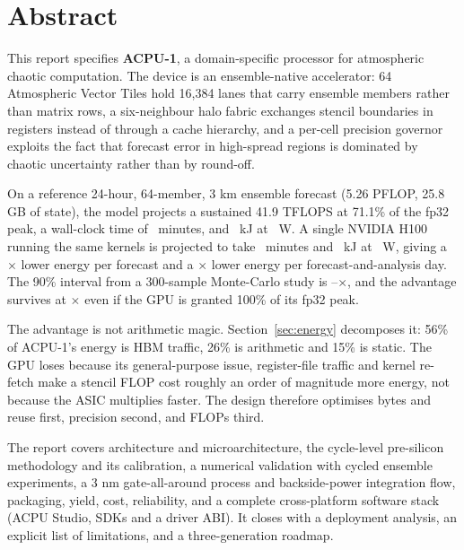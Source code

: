 \documentclass[10.5pt,a4paper]{article}
\newcommand{\ac}[1]{\textsf{\textbf{ACPU-#1}}}
\begin{document}
\setcounter{page}{2}

\section*{Abstract}
This report specifies \ac{1}, a domain-specific processor for atmospheric chaotic computation.
The device is an ensemble-native accelerator: 64 Atmospheric Vector Tiles hold 16,384 lanes that
carry ensemble members rather than matrix rows, a six-neighbour halo fabric exchanges stencil
boundaries in registers instead of through a cache hierarchy, and a per-cell precision governor
exploits the fact that forecast error in high-spread regions is dominated by chaotic uncertainty
rather than by round-off.

On a reference 24-hour, 64-member, 3 km ensemble forecast (5.26 PFLOP, 25.8 GB of state), the
model projects a sustained 41.9 TFLOPS at 71.1\% of the fp32 peak, a wall-clock time of
\ACForecastMin\ minutes, and \ACForecastKJ\ kJ at \ACForecastW\ W. A single NVIDIA H100 running
the same kernels is projected to take \ACGpuMin\ minutes and \ACGpuKJ\ kJ at \ACGpuW\ W, giving a
\ACRatioForecast$\times$ lower energy per forecast and a \ACRatioDay$\times$ lower energy per
forecast-and-analysis day. The 90\% interval from a 300-sample Monte-Carlo study is
\ACRatioDayLo--\ACRatioDayHi$\times$, and the advantage survives at \ACRatioIdeal$\times$ even if
the GPU is granted 100\% of its fp32 peak.

The advantage is not arithmetic magic. Section~\ref{sec:energy} decomposes it: 56\% of ACPU-1's
energy is HBM traffic, 26\% is arithmetic and 15\% is static. The GPU loses because its
general-purpose issue, register-file traffic and kernel re-fetch make a stencil FLOP cost roughly
an order of magnitude more energy, not because the ASIC multiplies faster. The design therefore
optimises bytes and reuse first, precision second, and FLOPs third.

The report covers architecture and microarchitecture, the cycle-level pre-silicon methodology and
its calibration, a numerical validation with cycled ensemble experiments, a 3 nm gate-all-around
process and backside-power integration flow, packaging, yield, cost, reliability, and a complete
cross-platform software stack (ACPU Studio, SDKs and a driver ABI). It closes with a deployment
analysis, an explicit list of limitations, and a three-generation roadmap.
\end{document}
